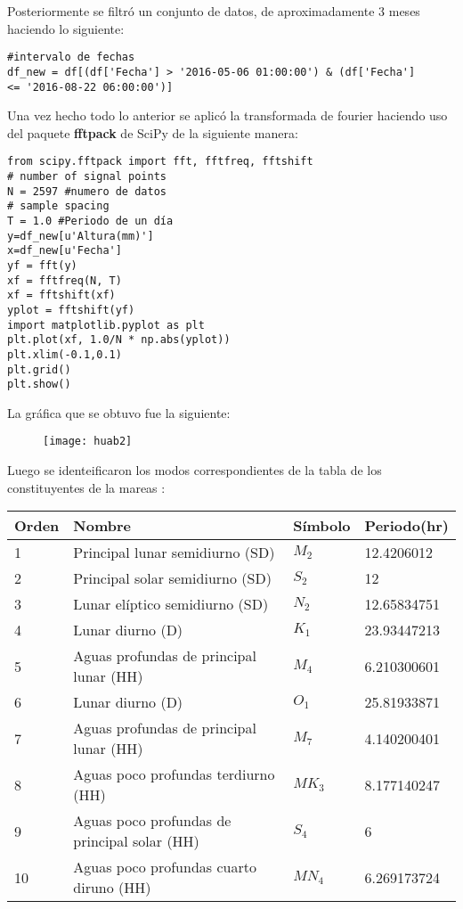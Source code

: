 \documentclass[12pt]{article}
\begin{document}
Posteriormente se filtró un conjunto de datos, de aproximadamente 3 meses haciendo lo siguiente:

\begin{verbatim}
#intervalo de fechas
df_new = df[(df['Fecha'] > '2016-05-06 01:00:00') & (df['Fecha'] 
<= '2016-08-22 06:00:00')] 
\end{verbatim}


Una vez hecho todo lo anterior se aplicó la transformada de fourier haciendo uso del paquete \textbf{fftpack} de SciPy de la siguiente manera:


\begin{verbatim}
from scipy.fftpack import fft, fftfreq, fftshift
# number of signal points
N = 2597 #numero de datos
# sample spacing
T = 1.0 #Periodo de un día
y=df_new[u'Altura(mm)']
x=df_new[u'Fecha']
yf = fft(y)
xf = fftfreq(N, T)
xf = fftshift(xf)
yplot = fftshift(yf)
import matplotlib.pyplot as plt
plt.plot(xf, 1.0/N * np.abs(yplot))
plt.xlim(-0.1,0.1)
plt.grid()
plt.show()
\end{verbatim}

La gráfica que se obtuvo fue la siguiente:

\begin{figure}[ht]
\texttt{[image: huab2]}
\centering
\end{figure}

\newpage 


Luego se identeificaron los modos correspondientes de la tabla de los constituyentes de la mareas : 

\begin{table}[htbp]
\begin{center}
\begin{tabular}{|l|l|l|l|}

\hline 
Orden & Nombre & Símbolo & Periodo(hr) \\
\hline \hline
1 & Principal lunar semidiurno (SD) & $M_{2}$ & 12.4206012\\ \hline
2 & Principal solar semidiurno (SD) & $S_{2}$ & 12 \\ \hline
3  & Lunar elíptico semidiurno (SD) & $N_{2}$ &12.65834751 \\ \hline
4 & Lunar diurno (D) & $K_{1}$ & 23.93447213 \\ \hline
5 & Aguas profundas de principal lunar (HH) & $M_{4}$ & 6.210300601 \\ \hline
6 & Lunar diurno (D) & $O_{1}$ & 25.81933871 \\ \hline
7 & Aguas profundas de principal lunar (HH) & $M_{7}$ & 4.140200401 \\ \hline
8 & Aguas poco profundas terdiurno (HH) & $MK_{3}$ &8.177140247 \\ \hline
9 & Aguas poco profundas de principal solar (HH) & $S_{4}$ & 6 \\ \hline
10 & Aguas poco profundas cuarto diruno (HH) & $MN_{4}$ & 6.269173724 	 \\ \hline



\end{tabular}

\end{center}
\end{table}
\end{document}
